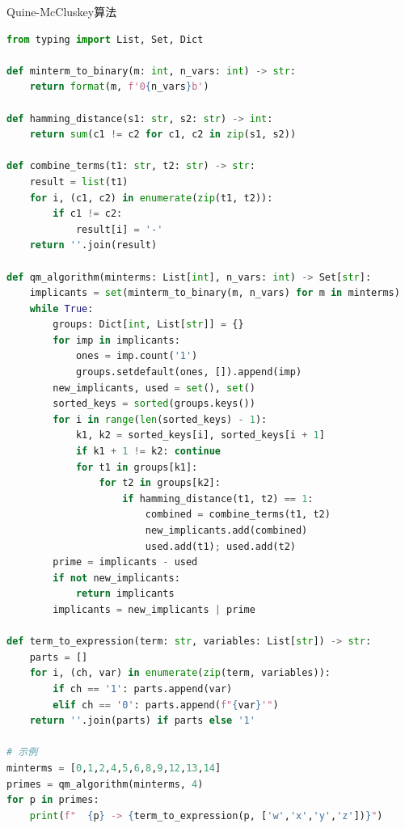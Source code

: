 \begin{mycode}{Quine-McCluskey算法}
\begin{lstlisting}[language=Python]
from typing import List, Set, Dict

def minterm_to_binary(m: int, n_vars: int) -> str:
    return format(m, f'0{n_vars}b')

def hamming_distance(s1: str, s2: str) -> int:
    return sum(c1 != c2 for c1, c2 in zip(s1, s2))

def combine_terms(t1: str, t2: str) -> str:
    result = list(t1)
    for i, (c1, c2) in enumerate(zip(t1, t2)):
        if c1 != c2:
            result[i] = '-'
    return ''.join(result)

def qm_algorithm(minterms: List[int], n_vars: int) -> Set[str]:
    implicants = set(minterm_to_binary(m, n_vars) for m in minterms)
    while True:
        groups: Dict[int, List[str]] = {}
        for imp in implicants:
            ones = imp.count('1')
            groups.setdefault(ones, []).append(imp)
        new_implicants, used = set(), set()
        sorted_keys = sorted(groups.keys())
        for i in range(len(sorted_keys) - 1):
            k1, k2 = sorted_keys[i], sorted_keys[i + 1]
            if k1 + 1 != k2: continue
            for t1 in groups[k1]:
                for t2 in groups[k2]:
                    if hamming_distance(t1, t2) == 1:
                        combined = combine_terms(t1, t2)
                        new_implicants.add(combined)
                        used.add(t1); used.add(t2)
        prime = implicants - used
        if not new_implicants:
            return implicants
        implicants = new_implicants | prime

def term_to_expression(term: str, variables: List[str]) -> str:
    parts = []
    for i, (ch, var) in enumerate(zip(term, variables)):
        if ch == '1': parts.append(var)
        elif ch == '0': parts.append(f"{var}'")
    return ''.join(parts) if parts else '1'

# 示例
minterms = [0,1,2,4,5,6,8,9,12,13,14]
primes = qm_algorithm(minterms, 4)
for p in primes:
    print(f"  {p} -> {term_to_expression(p, ['w','x','y','z'])}")
\end{lstlisting}
\end{mycode}

